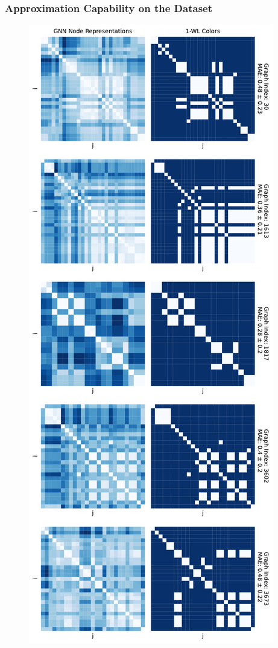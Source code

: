 \subsubsection{Approximation Capability on the \nci Dataset}
\begin{figure}[H]
    \centering
    \begin{minipage}[b]{0.45992852703\textwidth}
        \centering
        \includegraphics[width=\textwidth, left]{Figures/heatmaps_NCI1_0_k_wl_1.pdf}

\end{minipage}
\end{figure}
